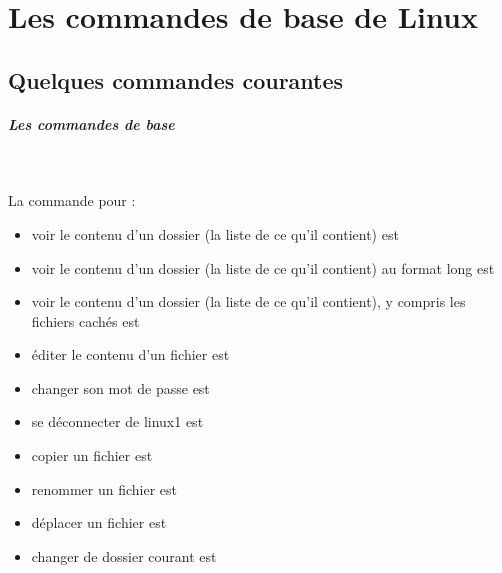 \documentclass[11pt,a4paper]{article}
\begin{document}
            \section{Les commandes de base de Linux}\subsection{Quelques commandes courantes}
			
		\subparagraph{Les commandes de base} 
		
                \textcolor{white}{.} \par
             
								La commande pour :  
							
					\begin{itemize}
				
			\item voir le contenu d'un dossier (la liste de ce qu'il contient) est  \textcolor{gray}{\underline{\hspace*{2em}}} 
			\item voir le contenu d'un dossier (la liste de ce qu'il contient) au format long est  \textcolor{gray}{\underline{\hspace*{3em}}} 
			\item voir le contenu d'un dossier (la liste de ce qu'il contient), y compris les fichiers cach\'es est  \textcolor{gray}{\underline{\hspace*{3em}}} 
			\item \'editer le contenu d'un fichier est  \textcolor{gray}{\underline{\hspace*{3em}}} 
			\item changer son mot de passe est  \textcolor{gray}{\underline{\hspace*{5em}}} 
			\item se d\'econnecter de linux1 est  \textcolor{gray}{\underline{\hspace*{3em}}} 
			\item copier un fichier est  \textcolor{gray}{\underline{\hspace*{2em}}} 
			\item renommer un fichier est  \textcolor{gray}{\underline{\hspace*{2em}}} 
			\item d\'eplacer un fichier est  \textcolor{gray}{\underline{\hspace*{2em}}} 
			\item changer de dossier courant est  \textcolor{gray}{\underline{\hspace*{2em}}} 

\end{itemize}
\end{document}
